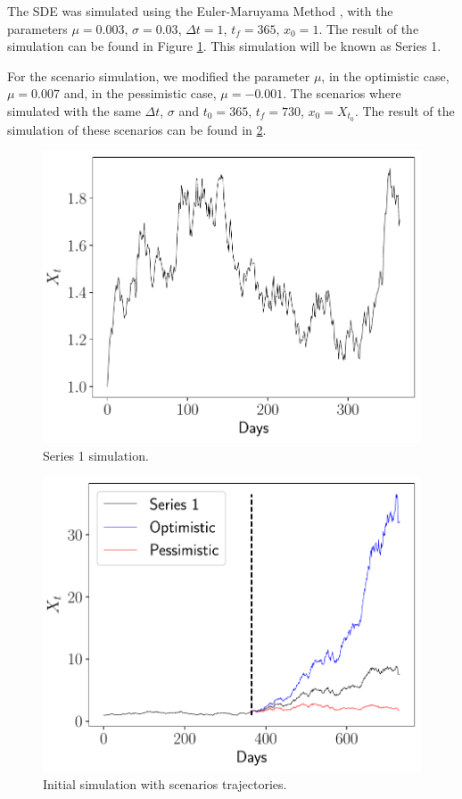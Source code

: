 \documentclass[11pt]{article}
\theoremstyle{definition}
\theoremstyle{remark}
\theoremstyle{remark}
\begin{document}
The SDE was simulated using the Euler-Maruyama Method
\parencite{higham2001}, with the parameters $\mu = 0.003$,
$\sigma = 0.03$, $\Delta t = 1$, $t_f = 365$, $x_0 = 1$. The result of
the simulation can be found in Figure \ref{fig:series1}. This
simulation will be known as Series 1.

For the scenario simulation, we modified the parameter $\mu$, in the
optimistic case, $\mu=0.007$ and, in the pessimistic case,
$\mu=-0.001$. The scenarios where simulated with the same $\Delta t$,
$\sigma$ and $t_0 = 365$, $t_f = 730$, $x_0=X_{t_0}$. The result of
the simulation of these scenarios can be found in \ref{fig:scenarios}.

\begin{figure}
  \centering
  \includegraphics[scale=0.5]{series1.pdf}
  \caption{Series 1 simulation.}
  \label{fig:series1}
\end{figure}

\begin{figure}
  \centering
  \includegraphics[scale=0.5]{pronostico-1-escenarios.pdf}
  \caption{Initial simulation with scenarios trajectories.}
  \label{fig:scenarios}
\end{figure}
\end{document}
